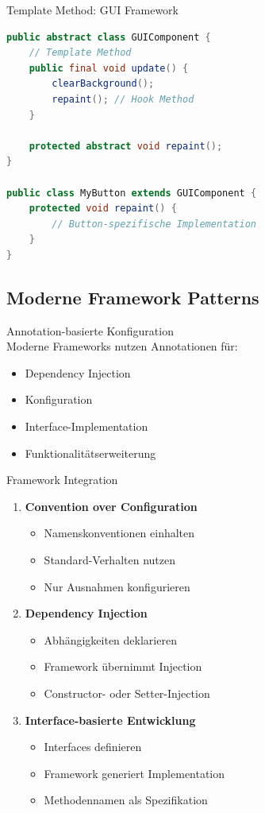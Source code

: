 \begin{example}{Template Method: GUI Framework}
\begin{lstlisting}[language=Java, style=base]
public abstract class GUIComponent {
    // Template Method
    public final void update() {
        clearBackground();
        repaint(); // Hook Method
    }
    
    protected abstract void repaint();
}

public class MyButton extends GUIComponent {
    protected void repaint() {
        // Button-spezifische Implementation
    }
}
\end{lstlisting}
\end{example}

\subsection{Moderne Framework Patterns}

\begin{concept}{Annotation-basierte Konfiguration}\\
Moderne Frameworks nutzen Annotationen für:
\begin{itemize}
    \item Dependency Injection
    \item Konfiguration
    \item Interface-Implementation
    \item Funktionalitätserweiterung
\end{itemize}
\end{concept}

\begin{KR}{Framework Integration}
\begin{enumerate}
    \item \textbf{Convention over Configuration}
    \begin{itemize}
        \item Namenskonventionen einhalten
        \item Standard-Verhalten nutzen
        \item Nur Ausnahmen konfigurieren
    \end{itemize}
    
    \item \textbf{Dependency Injection}
    \begin{itemize}
        \item Abhängigkeiten deklarieren
        \item Framework übernimmt Injection
        \item Constructor- oder Setter-Injection
    \end{itemize}
    
    \item \textbf{Interface-basierte Entwicklung}
    \begin{itemize}
        \item Interfaces definieren
        \item Framework generiert Implementation
        \item Methodennamen als Spezifikation
    \end{itemize}
\end{enumerate}
\end{KR}

